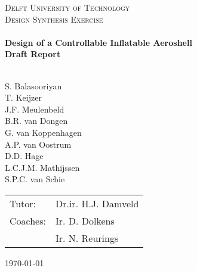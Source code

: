\begin{titlepage}
\begin{center}
\AddToShipoutPicture*{\BackgroundPic}
\color{white}
\textsc{\LARGE Delft University of Technology}\\[0.3cm]
\textsc{\Large Design Synthesis Exercise}\\[0.5cm]

\vspace{4cm}
\HRule \\[0.4cm]
{\Large \bfseries Design of a Controllable Inflatable Aeroshell}\\[0.2cm]
{\Huge \bfseries Draft Report}\\[0.2cm]
\HRule \\[0.5cm]


\begin{flushleft}
\vspace{8cm}

S. Balasooriyan \\ T. Keijzer \\ J.F. Meulenbeld \\ B.R. van Dongen \\  G. van Koppenhagen \\ A.P. van Oostrum \\ D.D. Hage  \\ L.C.J.M. Mathijssen   \\ S.P.C. van Schie\\
	\enlargethispage{15mm} \vspace{10mm}
	\hspace{-3.5mm}
	\begin{tabular}{l l}
		Tutor: & Dr.ir. H.J. Damveld \\
		Coaches: & Ir. D. Dolkens \\ 
		& Ir. N. Reurings \\
	\end{tabular}
\vfill
\begin{large}\today \end{large}
\end{flushleft}
\end{center}
\end{titlepage}